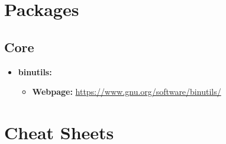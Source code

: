 \documentclass[10pt, a4paper, onecolumn, oneside, titlepage, openany]{book}
\begin{document}
\chapter{Packages}
\section{Core}
\begin{itemize}
    \item \textbf{binutils:}
    \begin{itemize}
        \item \textbf{Webpage:} \url{https://www.gnu.org/software/binutils/}
    \end{itemize}
\end{itemize}


\chapter{Cheat Sheets}
\end{document}
